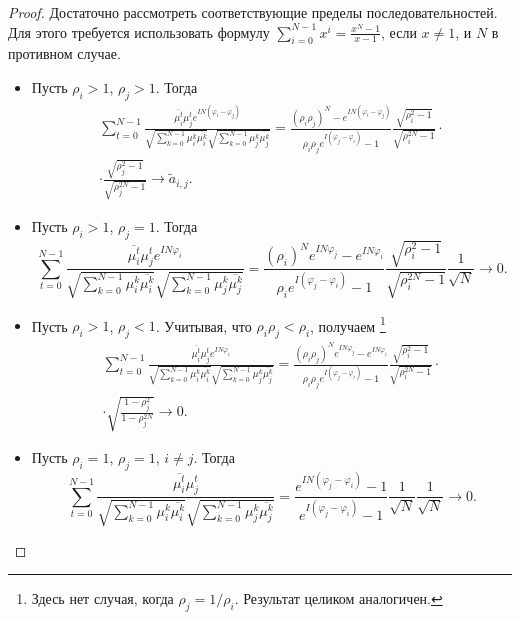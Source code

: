 \documentclass[12pt,a4paper]{article}
\begin{document}
	\begin{proof}
		Достаточно рассмотреть соответствующие пределы последовательностей. Для этого требуется использовать формулу $\sum_{i = 0}^{N-1} x^i = \frac{x^N-1}{x-1}$, если $x \ne 1$, и $N$ в противном случае.
		\begin{itemize}
			\item Пусть $\rho_i > 1$, $\rho_j > 1$. Тогда
			\begin{multline*}
			\sum_{t=0}^{N-1} \frac{\overline{\mu_i^t} \mu_j^t e^{I N (\varphi_i - \varphi_j)}}{\sqrt{\sum_{k=0}^{N-1} \mu_i^k \overline{\mu_i^k}} \sqrt{\sum_{k=0}^{N-1} \mu_j^k \overline{\mu_j^k}}} = \frac{(\rho_i \rho_j)^N - e^{I N(\varphi_i - \varphi_j)}}{\rho_i \rho_j e^{I (\varphi_j - \varphi_i)} - 1} \frac{\sqrt{\rho_i^2 - 1}}{\sqrt{\rho_i^{2N} - 1}} \cdot \\ \cdot \frac{\sqrt{\rho_j^2 - 1}}{\sqrt{\rho_j^{2N} - 1}} \to \tilde a_{i, j}.
			\end{multline*}
			
			\item Пусть $\rho_i > 1$, $\rho_j = 1$. Тогда
			\begin{equation*}
			\sum_{t=0}^{N-1} \frac{\overline{\mu_i^t} \mu_j^t e^{I N \varphi_i}}{\sqrt{\sum_{k=0}^{N-1} \mu_i^k \overline{\mu_i^k}} \sqrt{\sum_{k=0}^{N-1} \mu_j^k \overline{\mu_j^k}}} = \frac{(\rho_i )^N e^{I N \varphi_j} - e^{I N \varphi_i}}{\rho_i e^{I (\varphi_j - \varphi_i)} - 1} \frac{\sqrt{\rho_i^2 - 1}}{\sqrt{\rho_i^{2N} - 1}} \frac{1}{\sqrt{N}} \to 0.
			\end{equation*}
			
			\item Пусть $\rho_i > 1$, $\rho_j < 1$. Учитывая, что $\rho_i \rho_j < \rho_i$, получаем \footnote{Здесь нет случая, когда $\rho_j = 1/\rho_i$. Результат целиком аналогичен.}
			\begin{multline*}
			\sum_{t=0}^{N-1} \frac{\overline{\mu_i^t} \mu_j^t e^{I N \varphi_i}}{\sqrt{\sum_{k=0}^{N-1} \mu_i^k \overline{\mu_i^k}} \sqrt{\sum_{k=0}^{N-1} \mu_j^k \overline{\mu_j^k}}} = \frac{(\rho_i \rho_j)^N e^{I N \varphi_j} - e^{I N \varphi_i}}{\rho_i \rho_j e^{I (\varphi_j - \varphi_i)} - 1} \frac{\sqrt{\rho_i^2 - 1}}{\sqrt{\rho_i^{2N} - 1}} \cdot \\ \cdot \sqrt{\frac{1 - \rho_j^2}{1 - \rho_j^{2N}}} \to 0.
			\end{multline*}
			
			\item Пусть $\rho_i = 1$, $\rho_j = 1$, $i \ne j$. Тогда
			\begin{equation*}
			\sum_{t=0}^{N-1} \frac{\overline{\mu_i^t} \mu_j^t}{\sqrt{\sum_{k=0}^{N-1} \mu_i^k \overline{\mu_i^k}} \sqrt{\sum_{k=0}^{N-1} \mu_j^k \overline{\mu_j^k}}} = \frac{e^{I N (\varphi_j -\varphi_i)} - 1}{e^{I (\varphi_j - \varphi_i)} - 1} \frac{1}{\sqrt{N}} \frac{1}{\sqrt{N}} \to 0.
			\end{equation*}
			

\end{itemize}
\end{proof}
\end{document}
